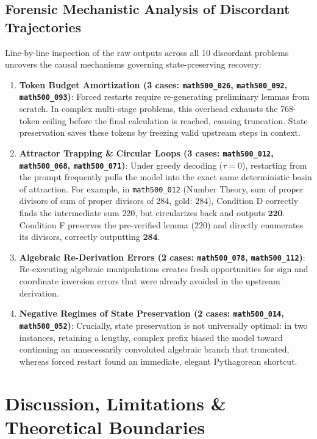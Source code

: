 \documentclass[11pt]{article}
\begin{document}
\subsection{Forensic Mechanistic Analysis of Discordant Trajectories}
Line-by-line inspection of the raw outputs across all 10 discordant problems uncovers the causal mechanisms governing state-preserving recovery:
\begin{enumerate}
    \item \textbf{Token Budget Amortization (3 cases: \texttt{math500\_026}, \texttt{math500\_092}, \texttt{math500\_093})}: Forced restarts require re-generating preliminary lemmas from scratch. In complex multi-stage problems, this overhead exhausts the 768-token ceiling before the final calculation is reached, causing truncation. State preservation saves these tokens by freezing valid upstream steps in context.
    \item \textbf{Attractor Trapping \& Circular Loops (3 cases: \texttt{math500\_012}, \texttt{math500\_068}, \texttt{math500\_071})}: Under greedy decoding ($\tau = 0$), restarting from the prompt frequently pulls the model into the exact same deterministic basin of attraction. For example, in \texttt{math500\_012} (Number Theory, sum of proper divisors of sum of proper divisors of 284, gold: $284$), Condition D correctly finds the intermediate sum $220$, but circularizes back and outputs $\mathbf{220}$. Condition F preserves the pre-verified lemma ($220$) and directly enumerates its divisors, correctly outputting $\mathbf{284}$.
    \item \textbf{Algebraic Re-Derivation Errors (2 cases: \texttt{math500\_078}, \texttt{math500\_112})}: Re-executing algebraic manipulations creates fresh opportunities for sign and coordinate inversion errors that were already avoided in the upstream derivation.
    \item \textbf{Negative Regimes of State Preservation (2 cases: \texttt{math500\_014}, \texttt{math500\_052})}: Crucially, state preservation is not universally optimal: in two instances, retaining a lengthy, complex prefix biased the model toward continuing an unnecessarily convoluted algebraic branch that truncated, whereas forced restart found an immediate, elegant Pythagorean shortcut.
\end{enumerate}

\section{Discussion, Limitations \& Theoretical Boundaries}
\end{document}
